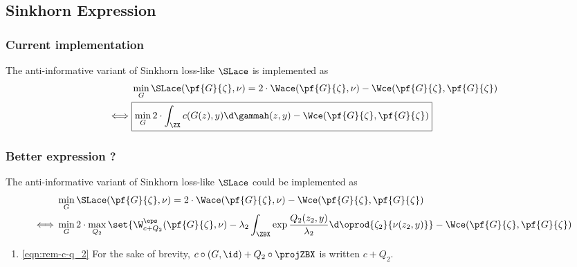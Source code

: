 \documentclass[11pt,a4paper]{article}
\begin{document}
\subsection{Sinkhorn Expression}

\subsubsection{Current implementation}

The anti-informative variant of Sinkhorn loss-like $\SLace$ is implemented as
\begin{align}
    &\min_{G} \SLace(\pf{G}{\zeta}, \nu) = 2 \cdot \Wace(\pf{G}{\zeta}, \nu) - \Wce(\pf{G}{\zeta}, \pf{G}{\zeta}) \\%
    \iff &\boxed{\min_{G} 2 \cdot \int_{\ZX}c(G(z), y) \d \gammah(z, y) - \Wce(\pf{G}{\zeta}, \pf{G}{\zeta})}
\end{align}

\subsubsection{Better expression ?}

The anti-informative variant of Sinkhorn loss-like $\SLace$ could be implemented as
\begin{align}
    &\min_{G} \SLace(\pf{G}{\zeta}, \nu) = 2 \cdot \Wace(\pf{G}{\zeta}, \nu) - \Wce(\pf{G}{\zeta}, \pf{G}{\zeta}) \\%
    \iff &\min_{G} 2 \cdot \max_{Q_2}\set{ \W_{c + Q_2}^{\eps}(\pf{G}{\zeta}, \nu)- \lambda_2 \int_{\ZBX}{\exp{\frac{Q_2(z_2, y)}{\lambda_2}} \d \oprod{\zeta_2 }{\nu (z_2, y)}}} - \Wce(\pf{G}{\zeta}, \pf{G}{\zeta}) \label{eqn:rem-c-q_2}
\end{align}

\begin{rems}
    \begin{enumerate}
        \item \eqref{eqn:rem-c-q_2} For the sake of brevity, $c \circ (G, \id) + Q_2 \circ \projZBX$ is written $c + Q_2$.
    \end{enumerate}
\end{rems}
\end{document}
